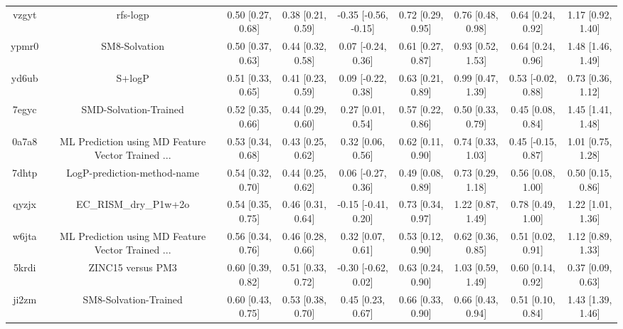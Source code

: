 \documentclass{article}
\begin{document}
\begin{center}
\begin{longtable}{|ccccccccc|}
 vzgyt &                                           rfs-logp &  0.50 [0.27, 0.68] &  0.38 [0.21, 0.59] &  -0.35 [-0.56, -0.15] &  0.72 [0.29, 0.95] &    0.76 [0.48, 0.98] &    0.64 [0.24, 0.92] &     1.17 [0.92, 1.40] \\
 ypmr0 &                                      SM8-Solvation &  0.50 [0.37, 0.63] &  0.44 [0.32, 0.58] &    0.07 [-0.24, 0.36] &  0.61 [0.27, 0.87] &    0.93 [0.52, 1.53] &    0.64 [0.24, 0.96] &     1.48 [1.46, 1.49] \\
 yd6ub &                                             S+logP &  0.51 [0.33, 0.65] &  0.41 [0.23, 0.59] &    0.09 [-0.22, 0.38] &  0.63 [0.21, 0.89] &    0.99 [0.47, 1.39] &   0.53 [-0.02, 0.88] &     0.73 [0.36, 1.12] \\
 7egyc &                              SMD-Solvation-Trained &  0.52 [0.35, 0.66] &  0.44 [0.29, 0.60] &     0.27 [0.01, 0.54] &  0.57 [0.22, 0.86] &    0.50 [0.33, 0.79] &    0.45 [0.08, 0.84] &     1.45 [1.41, 1.48] \\
 0a7a8 &  ML Prediction using MD Feature Vector Trained ... &  0.53 [0.34, 0.68] &  0.43 [0.25, 0.62] &     0.32 [0.06, 0.56] &  0.62 [0.11, 0.90] &    0.74 [0.33, 1.03] &   0.45 [-0.15, 0.87] &     1.01 [0.75, 1.28] \\
 7dhtp &                        LogP-prediction-method-name &  0.54 [0.32, 0.70] &  0.44 [0.25, 0.62] &    0.06 [-0.27, 0.36] &  0.49 [0.08, 0.89] &    0.73 [0.29, 1.18] &    0.56 [0.08, 1.00] &     0.50 [0.15, 0.86] \\
 qyzjx &                              EC\_RISM\_dry\_P1w+2o &  0.54 [0.35, 0.75] &  0.46 [0.31, 0.64] &   -0.15 [-0.41, 0.20] &  0.73 [0.34, 0.97] &    1.22 [0.87, 1.49] &    0.78 [0.49, 1.00] &     1.22 [1.01, 1.36] \\
 w6jta &  ML Prediction using MD Feature Vector Trained ... &  0.56 [0.34, 0.76] &  0.46 [0.28, 0.66] &     0.32 [0.07, 0.61] &  0.53 [0.12, 0.90] &    0.62 [0.36, 0.85] &    0.51 [0.02, 0.91] &     1.12 [0.89, 1.33] \\
 5krdi &                                  ZINC15 versus PM3 &  0.60 [0.39, 0.82] &  0.51 [0.33, 0.72] &   -0.30 [-0.62, 0.02] &  0.63 [0.24, 0.90] &    1.03 [0.59, 1.49] &    0.60 [0.14, 0.92] &     0.37 [0.09, 0.63] \\
 ji2zm &                              SM8-Solvation-Trained &  0.60 [0.43, 0.75] &  0.53 [0.38, 0.70] &     0.45 [0.23, 0.67] &  0.66 [0.33, 0.90] &    0.66 [0.43, 0.94] &    0.51 [0.10, 0.84] &     1.43 [1.39, 1.46] \\

\end{longtable}
\end{center}
\end{document}
